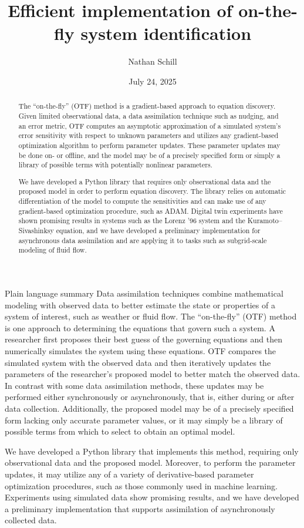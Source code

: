 \documentclass[12pt]{article}
\title{Efficient implementation of on-the-fly system identification}
\author{Nathan Schill}
\date{July 24, 2025}
\begin{document}
\maketitle

\begin{abstract}
  The ``on-the-fly'' (OTF) method is a gradient-based approach to equation discovery.
  Given limited observational data, a data assimilation technique such as nudging, and an error metric, OTF computes an asymptotic approximation of a simulated system's error sensitivity with respect to unknown parameters and utilizes any gradient-based optimization algorithm to perform parameter updates.
  These parameter updates may be done on- or offline, and the model may be of a precisely specified form or simply a library of possible terms with potentially nonlinear parameters.

  We have developed a Python library that requires only observational data and the proposed model in order to perform equation discovery.
  The library relies on automatic differentiation of the model to compute the sensitivities and can make use of any gradient-based optimization procedure, such as ADAM.
  Digital twin experiments have shown promising results in systems such as the Lorenz '96 system and the Kuramoto--Sivashinksy equation, and we have developed a preliminary implementation for asynchronous data assimilation and are applying it to tasks such as subgrid-scale modeling of fluid flow.
\end{abstract}

\begin{section}{Plain language summary}
  Data assimilation techniques combine mathematical modeling with observed data to better estimate the state or properties of a system of interest, such as weather or fluid flow.
  The ``on-the-fly'' (OTF) method is one approach to determining the equations that govern such a system.
  A researcher first proposes their best guess of the governing equations and then numerically simulates the system using these equations.
  OTF compares the simulated system with the observed data and then iteratively updates the parameters of the researcher's proposed model to better match the observed data.
  In contrast with some data assimilation methods, these updates may be performed either synchronously or asynchronously, that is, either during or after data collection.
  Additionally, the proposed model may be of a precisely specified form lacking only accurate parameter values, or it may simply be a library of possible terms from which to select to obtain an optimal model.

  We have developed a Python library that implements this method, requiring only observational data and the proposed model.
  Moreover, to perform the parameter updates, it may utilize any of a variety of derivative-based parameter optimization procedures, such as those commonly used in machine learning.
  Experiments using simulated data show promising results, and we have developed a preliminary implementation that supports assimilation of asynchronously collected data.
\end{section}
\end{document}
